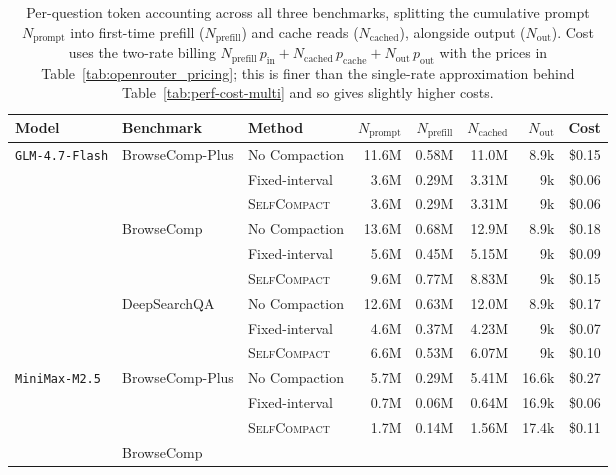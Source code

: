 \documentclass{article}
\newcommand{\method}{\textsc{{SelfCompact}}}
\begin{document}
  \begin{table}[h!]
  \centering
  \small
  \caption{Per-question token accounting across all three benchmarks, splitting the
  cumulative prompt $N_{\text{prompt}}$ into first-time prefill
  ($N_{\text{prefill}}$) and cache reads ($N_{\text{cached}}$), alongside output
  ($N_{\text{out}}$). Cost uses the two-rate billing
  $N_{\text{prefill}}\,p_{\text{in}} + N_{\text{cached}}\,p_{\text{cache}} + N_{\text{out}}\,p_{\text{out}}$
  with the prices in Table~\ref{tab:openrouter_pricing}; this is finer than the
  single-rate approximation behind Table~\ref{tab:perf-cost-multi} and so gives
  slightly higher costs.}
  \label{tab:tokens_all}
  \setlength{\tabcolsep}{4pt}
  \begin{tabular}{lllrrrrr}
  \toprule
  \textbf{Model} & \textbf{Benchmark} & \textbf{Method} & $N_{\text{prompt}}$ & $N_{\text{prefill}}$
  & $N_{\text{cached}}$ & $N_{\text{out}}$ & \textbf{Cost} \\
  \midrule
  \multirow{9}{*}{\texttt{GLM-4.7-Flash}}
   & \multirow{3}{*}{BrowseComp-Plus}
     & No Compaction  & 11.6M & 0.58M & 11.0M & 8.9k & \$0.15 \\
   & & Fixed-interval &  3.6M & 0.29M &  3.31M & 9k   & \$0.06 \\
   & & \method{}      &  3.6M & 0.29M &  3.31M & 9k   & \$0.06 \\
  \cmidrule(lr){2-8}
   & \multirow{3}{*}{BrowseComp}
     & No Compaction  & 13.6M & 0.68M & 12.9M & 8.9k & \$0.18 \\
   & & Fixed-interval &  5.6M & 0.45M &  5.15M & 9k   & \$0.09 \\
   & & \method{}      &  9.6M & 0.77M &  8.83M & 9k   & \$0.15 \\
  \cmidrule(lr){2-8}
   & \multirow{3}{*}{DeepSearchQA}
     & No Compaction  & 12.6M & 0.63M & 12.0M & 8.9k & \$0.17 \\
   & & Fixed-interval &  4.6M & 0.37M &  4.23M & 9k   & \$0.07 \\
   & & \method{}      &  6.6M & 0.53M &  6.07M & 9k   & \$0.10 \\
  \midrule
  \multirow{9}{*}{\texttt{MiniMax-M2.5}}
   & \multirow{3}{*}{BrowseComp-Plus}
     & No Compaction  &  5.7M & 0.29M &  5.41M & 16.6k & \$0.27 \\
   & & Fixed-interval &  0.7M & 0.06M &  0.64M & 16.9k & \$0.06 \\
   & & \method{}      &  1.7M & 0.14M &  1.56M & 17.4k & \$0.11 \\
  \cmidrule(lr){2-8}
   & \multirow{3}{*}{BrowseComp}

\end{tabular}
\end{table}
\end{document}
